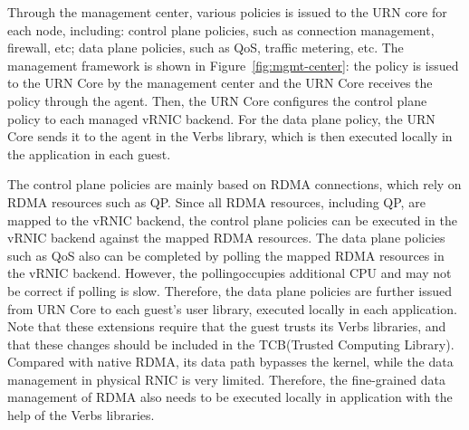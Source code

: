 Through the management center, various policies is issued to the URN core for each node, including: control plane policies, such as connection management, firewall, etc; data plane policies, such as QoS, traffic metering, etc. The management framework is shown in Figure~\ref{fig:mgmt-center}: the policy is issued to the URN Core by the management center and the URN Core receives the policy through the agent. Then, the URN Core configures the control plane policy to each managed vRNIC backend. For the data plane policy, the URN Core sends it to the agent in the Verbs library, which is then executed locally in the application in each guest.

The control plane policies are mainly based on RDMA connections, which rely on RDMA resources such as QP. Since all RDMA resources, including QP, are mapped to the vRNIC backend, the control plane policies can be executed in the vRNIC backend against the mapped RDMA resources. The data plane policies such as QoS also can be completed by polling the mapped RDMA resources in the vRNIC backend. However, the pollingoccupies additional CPU and may not be correct if polling is slow. Therefore, the data plane policies are further issued from URN Core to each guest's user library, executed locally in each application. Note that these extensions require that the guest trusts its Verbs libraries, and that these changes should be included in the TCB(Trusted Computing Library). Compared with native RDMA, its data path bypasses the kernel, while the data management in physical RNIC is very limited. Therefore, the fine-grained data management of RDMA also needs to be executed locally in application with the help of the Verbs libraries.

